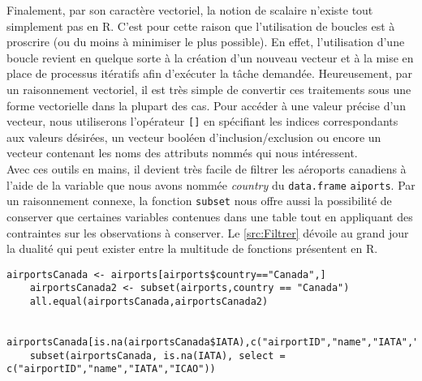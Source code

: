 Finalement, par son caractère vectoriel, la notion de scalaire n'existe tout simplement pas en R. C'est pour cette raison que l'utilisation de boucles est à proscrire (ou du moins à minimiser le plus possible). En effet, l'utilisation d'une boucle revient en quelque sorte à la création d'un nouveau vecteur et à la mise en place de processus itératifs afin d'exécuter la tâche demandée. Heureusement, par un raisonnement vectoriel, il est très simple de convertir ces traitements sous une forme vectorielle dans la plupart des cas. \cite{Goulet} Pour accéder à une valeur précise d'un vecteur, nous utiliserons l'opérateur \texttt{[]} en spécifiant les indices correspondants aux valeurs désirées, un vecteur booléen d'inclusion/exclusion ou encore un vecteur contenant les noms des attributs nommés qui nous intéressent. \\

Avec ces outils en mains, il devient très facile de filtrer les aéroports canadiens à l'aide de la variable que nous avons nommée \emph{country} du \texttt{data.frame} \texttt{aiports}. Par un raisonnement connexe, la fonction \texttt{subset} \cite{Rfunction:subset} nous offre aussi la possibilité de conserver que certaines variables contenues dans une table tout en appliquant des contraintes sur les observations à conserver. Le \autoref{src:Filtrer} dévoile au grand jour la dualité qui peut exister entre la multitude de fonctions présentent en R. \\

\begin{lstlisting}[caption = Filtrer les données,label=src:Filter]
	airportsCanada <- airports[airports$country=="Canada",]
	airportsCanada2 <- subset(airports,country == "Canada")
	all.equal(airportsCanada,airportsCanada2)

	airportsCanada[is.na(airportsCanada$IATA),c("airportID","name","IATA","ICAO")]
	subset(airportsCanada, is.na(IATA), select = c("airportID","name","IATA","ICAO"))
\end{lstlisting}

